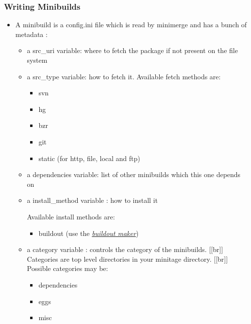 \documentclass[letterpaper,10pt,english]{sphinxmanual}
\begin{document}
\subsubsection{Writing Minibuilds}
\label{spec:writing-minibuilds}\begin{itemize}
\item {} 
A minibuild is a config.ini file  which is read by minimerge and has a bunch of metadata :
\begin{itemize}
\item {} 
a src\_uri variable: where to fetch the package if not present on the file system

\item {} 
a src\_type variable: how to fetch it.
Available fetch methods are:
\begin{itemize}
\item {} 
svn

\item {} 
hg

\item {} 
bzr

\item {} 
git

\item {} 
static (for http, file, local and ftp)

\end{itemize}

\item {} 
a dependencies variable: list of other minibuilds which this one depends on

\item {} 
a install\_method variable : how to install it

Available install methods are:
\begin{itemize}
\item {} 
buildout (use the {\hyperref[spec:buildout-maker]{\emph{buildout maker}}})

\end{itemize}

\item {} 
a category variable : controls the category of the minibuilds. {[}{[}br{]}{]}
Categories are top level  directories in your minitage directory. {[}{[}br{]}{]}
Possible categories may be:
\begin{itemize}
\item {} 
dependencies

\item {} 
eggs

\item {} 
misc


\end{itemize}
\end{itemize}
\end{itemize}
\end{document}
